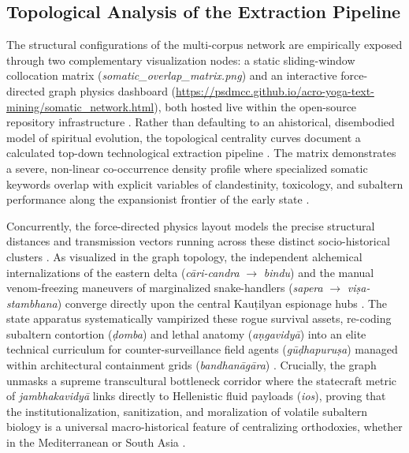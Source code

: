 \documentclass[11pt,twoside,letterpaper]{article}
\begin{document}
\subsection{Topological Analysis of the Extraction Pipeline}
The structural configurations of the multi-corpus network are empirically exposed through two complementary visualization nodes: a static sliding-window collocation matrix (\textit{somatic\_overlap\_matrix.png}) and an interactive force-directed graph physics dashboard (\href{https://github.io}{https://psdmcc.github.io/acro-yoga-text-mining/somatic\_network.html}), both hosted live within the open-source repository infrastructure \citet{McCartney2021}. Rather than defaulting to an ahistorical, disembodied model of spiritual evolution, the topological centrality curves document a calculated top-down technological extraction pipeline \citep{Mallinson2017}. The matrix demonstrates a severe, non-linear co-occurrence density profile where specialized somatic keywords overlap with explicit variables of clandestinity, toxicology, and subaltern performance along the expansionist frontier of the early state \citep{Mallinson2017, McCartney2021}.

Concurrently, the force-directed physics layout models the precise structural distances and transmission vectors running across these distinct socio-historical clusters \citep{Lorenzen2011}. As visualized in the graph topology, the independent alchemical internalizations of the eastern delta (\textit{cāri-candra} $\rightarrow$ \textit{bindu}) and the manual venom-freezing maneuvers of marginalized snake-handlers (\textit{sapera} $\rightarrow$ \textit{viṣa-stambhana}) converge directly upon the central Kauṭilyan espionage hubs \citep{Lorenzen2011, Mallinson2017}. The state apparatus systematically vampirized these rogue survival assets, re-coding subaltern contortion (\textit{ḍomba}) and lethal anatomy (\textit{aṇgavidyā}) into an elite technical curriculum for counter-surveillance field agents (\textit{gūḍhapuruṣa}) managed within architectural containment grids (\textit{bandhanāgāra}) \citep{McCartney2026}. Crucially, the graph unmasks a supreme transcultural bottleneck corridor where the statecraft metric of \textit{jambhakavidyā} links directly to Hellenistic fluid payloads (\textit{ios}), proving that the institutionalization, sanitization, and moralization of volatile subaltern biology is a universal macro-historical feature of centralizing orthodoxies, whether in the Mediterranean or South Asia \citep{Debnath2024, Lorenzen2011, McCartney2021}.
\end{document}
